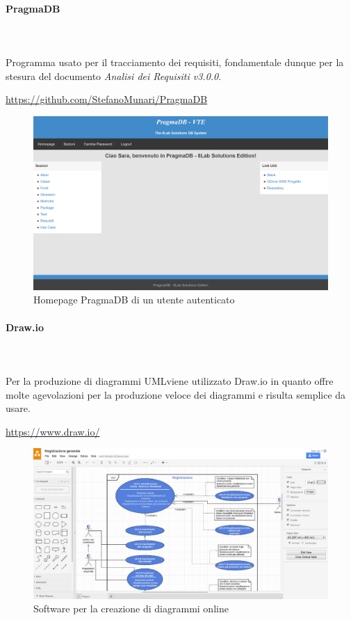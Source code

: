 		\paragraph{PragmaDB} \mbox{}\\ \mbox{}\\
		Programma usato per il tracciamento dei requisiti, fondamentale dunque 
		per la stesura del documento \textit{Analisi dei Requisiti v3.0.0}. 
		\newline
		\centerline{\url{https://github.com/StefanoMunari/PragmaDB}}
			\begin{figure}[H]
				\includegraphics[width=0.99\linewidth]{res/images/HomepagePragmaDB.png}
				\caption{Homepage PragmaDB di un utente autenticato}
			\end{figure}

		\paragraph{Draw.io} \mbox{}\\ \mbox{}\\
		Per la produzione di diagrammi UML\glosp viene utilizzato Draw.io in quanto 
		offre molte agevolazioni per la produzione veloce dei diagrammi e risulta 
		semplice da usare. \newline
		\centerline{\url{https://www.draw.io/}}
			\begin{figure}[H]
				\includegraphics[width=0.99\linewidth]{res/images/drawio.jpg}
				\caption{Software per la creazione di diagrammi online}
			\end{figure} 
				
